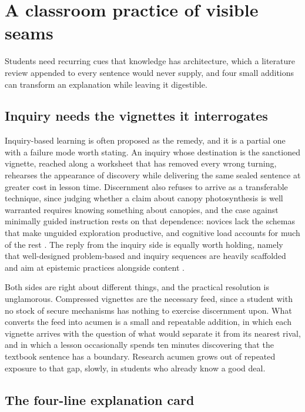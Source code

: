 \section{A classroom practice of visible seams}

Students need recurring cues that knowledge has architecture, which a literature review appended to every sentence would never supply, and four small additions can transform an explanation while leaving it digestible.

\subsection{Inquiry needs the vignettes it interrogates}

Inquiry-based learning is often proposed as the remedy, and it is a partial one with a failure mode worth stating. An inquiry whose destination is the sanctioned vignette, reached along a worksheet that has removed every wrong turning, rehearses the appearance of discovery while delivering the same sealed sentence at greater cost in lesson time. Discernment also refuses to arrive as a transferable technique, since judging whether a claim about canopy photosynthesis is well warranted requires knowing something about canopies, and the case against minimally guided instruction rests on that dependence: novices lack the schemas that make unguided exploration productive, and cognitive load accounts for much of the rest \citep{kirschner2006}. The reply from the inquiry side is equally worth holding, namely that well-designed problem-based and inquiry sequences are heavily scaffolded and aim at epistemic practices alongside content \citep{hmelosilver2007}.

Both sides are right about different things, and the practical resolution is unglamorous. Compressed vignettes are the necessary feed, since a student with no stock of secure mechanisms has nothing to exercise discernment upon. What converts the feed into acumen is a small and repeatable addition, in which each vignette arrives with the question of what would separate it from its nearest rival, and in which a lesson occasionally spends ten minutes discovering that the textbook sentence has a boundary. Research acumen grows out of repeated exposure to that gap, slowly, in students who already know a good deal.

\subsection{The four-line explanation card}

